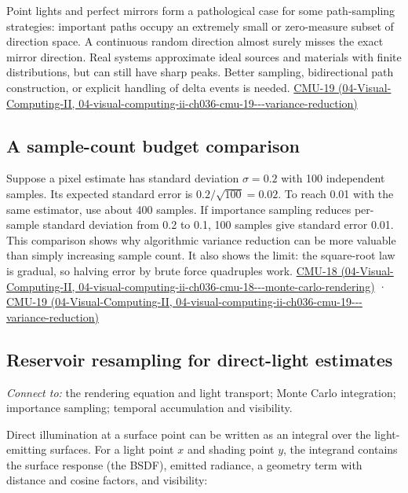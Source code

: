 Point lights and perfect mirrors form a pathological case for some path-sampling strategies: important paths occupy an extremely small or zero-measure subset of direction space. A continuous random direction almost surely misses the exact mirror direction. Real systems approximate ideal sources and materials with finite distributions, but can still have sharp peaks. Better sampling, bidirectional path construction, or explicit handling of delta events is needed. \href{../04-Visual-Computing-II/main.pdf\#nameddest=04-visual-computing-ii-ch036-cmu-19---variance-reduction}{CMU-19 (04-Visual-Computing-II, 04-visual-computing-ii-ch036-cmu-19-\/-\/-variance-reduction)}

\subsection{A sample-count budget comparison}\label{03-visual-computing-i-ch012-a-sample-count-budget-comparison}

Suppose a pixel estimate has standard deviation \(\sigma=0.2\) with 100 independent samples. Its expected standard error is \(0.2/\sqrt{100}=0.02\). To reach 0.01 with the same estimator, use about 400 samples. If importance sampling reduces per-sample standard deviation from 0.2 to 0.1, 100 samples give standard error 0.01. This comparison shows why algorithmic variance reduction can be more valuable than simply increasing sample count. It also shows the limit: the square-root law is gradual, so halving error by brute force quadruples work. \href{../04-Visual-Computing-II/main.pdf\#nameddest=04-visual-computing-ii-ch036-cmu-18---monte-carlo-rendering}{CMU-18 (04-Visual-Computing-II, 04-visual-computing-ii-ch036-cmu-18-\/-\/-monte-carlo-rendering)} · \href{../04-Visual-Computing-II/main.pdf\#nameddest=04-visual-computing-ii-ch036-cmu-19---variance-reduction}{CMU-19 (04-Visual-Computing-II, 04-visual-computing-ii-ch036-cmu-19-\/-\/-variance-reduction)}

\subsection{Reservoir resampling for direct-light estimates}\label{03-visual-computing-i-ch012-reservoir-resampling-for-direct-light-estimates}

\emph{Connect to:} the rendering equation and light transport; Monte Carlo integration; importance sampling; temporal accumulation and visibility.

Direct illumination at a surface point can be written as an integral over the light-emitting surfaces. For a light point \(x\) and shading point \(y\), the integrand contains the surface response (the BSDF), emitted radiance, a geometry term with distance and cosine factors, and visibility:

